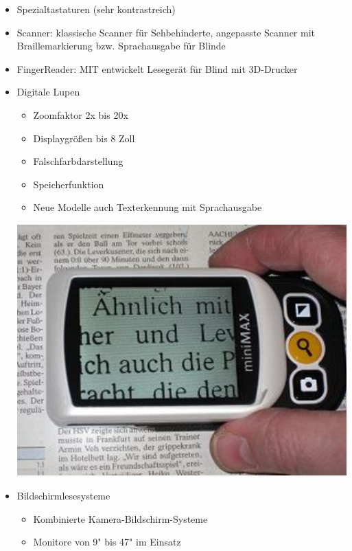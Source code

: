 \documentclass[paper=a4, fontsize=11pt]{scrartcl} %
\numberwithin{equation}{section} %
\numberwithin{figure}{section} %
\numberwithin{table}{section} %
\begin{document}
\begin{itemize}
\item Spezialtastaturen (sehr kontrastreich)
\item Scanner: klassische Scanner für Sehbehinderte, angepasste Scanner mit Braillemarkierung bzw. Sprachausgabe für Blinde
\item FingerReader: MIT entwickelt Lesegerät für Blind mit 3D-Drucker
\item Digitale Lupen\\ 
\begin{minipage}[c]{0.55\textwidth}
\begin{itemize}
\item Zoomfaktor 2x bis 20x
\item Displaygrößen bis 8 Zoll
\item Falschfarbdarstellung
\item Speicherfunktion
\item Neue Modelle auch Texterkennung mit Sprachausgabe
\end{itemize}
\end{minipage}
\begin{minipage}[c]{0.3\textwidth}
\includegraphics[width=\textwidth]{imgs/lupe}
\end{minipage}
\item Bildschirmlesesysteme\\
\begin{minipage}[c]{0.55\textwidth}
\begin{itemize}
\item Kombinierte Kamera-Bildschirm-Systeme
\item Monitore von 9" bis 47" im Einsatz

\end{itemize}
\end{minipage}
\end{itemize}
\end{document}
